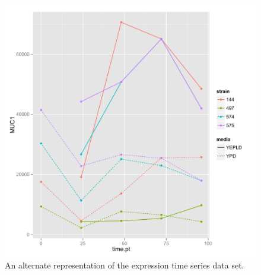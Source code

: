 

%
\begin{figure}[htbp]
\centering
\includegraphics[width=0.5\columnwidth]{./figures/hands-on3/timeseries-alt.pdf}
\caption{An alternate representation of the expression time series data set.\label{fig:yeastalt}}
\end{figure}


    

